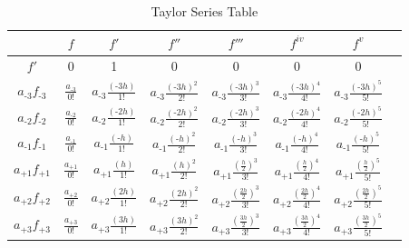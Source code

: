 \begin{table}[htbp]
	\centering
	\caption{Taylor Series Table}
		\begin{tabular}{c|c|c|c|c|c|c|c} %
			\textbf{}          &\textbf{$f$} & \textbf{$f'$}            & \textbf{$f''$}                                 & \textbf{$f'''$}                                 & \textbf{$f^{iv}$}                             & \textbf{$f^{v}$}                                \\
			\hline
			$f'$                                     & 0                                     & 1                                                       &                                                    0       &                                                              0&                                                      0&                                                                     0&\\
			$a_{\text{-}3}f_{\text{-}3}$& $\frac{a_{\text{-}3}}{0!}$ &$a_{\text{-}3}\frac{(\text{-}3h)}{1!}$ &$a_{\text{-}3}\frac{(\text{-}3h)^2}{2!}$  &$a_{\text{-}3}\frac{(\text{-}3h)^3}{3!}$   &$a_{\text{-}3}\frac{(\text{-}3h)^4}{4!}$    &$a_{\text{-}3}\frac{(\text{-}3h)^5}{5!}$   &\\ 
			$a_{\text{-}2}f_{\text{-}2}$& $\frac{a_{\text{-}2}}{0!}$ &$a_{\text{-}2}\frac{(\text{-}2h)}{1!}$ &$a_{\text{-}2}\frac{(\text{-}2h)^2}{2!}$  &$a_{\text{-}2}\frac{(\text{-}2h)^3}{3!}$   &$a_{\text{-}2}\frac{(\text{-}2h)^4}{4!}$    &$a_{\text{-}2}\frac{(\text{-}2h)^5}{5!}$   &\\
			$a_{\text{-}1}f_{\text{-}1}$& $\frac{a_{\text{-}1}}{0!}$ &$a_{\text{-}1}\frac{(\text{-}h)}{1!}$   &$a_{\text{-}1}\frac{(\text{-}h)^2}{2!}$    &$a_{\text{-}1}\frac{(\text{-}h  )^3}{3!}$   &$a_{\text{-}1}\frac{(\text{-}h )^4}{4!}$     &$a_{\text{-}1}\frac{(\text{-}h )^5}{5!}$    &\\
			$a_{+1}f_{+1}$                   & $\frac{a_{+1}}{0!}$           &$a_{+1}\frac{(h)}{1!}$                         &$a_{+1}\frac{(h)^2}{2!}$                         &$a_{+1}\frac{(\frac{h}{2})^3 }{3!}$           &$a_{+1}\frac{(\frac{h}{2})         ^4}{4!}$     &$a_{+1}\frac{(\frac{h}{2})^5}{5!}$             &\\
			$a_{+2}f_{+2}$                   & $\frac{a_{+2}}{0!}$           &$a_{+2}\frac{(2h)}{1!}$                       &$a_{+2}\frac{(2h)^2}{2!}$                       &$a_{+2}\frac{(\frac{2h}{2})^3}{3!}$          &$a_{+2}\frac{(\frac{2h}{2})       ^4}{4!}$     &$a_{+2}\frac{(\frac{2h}{2})^5}{5!}$           &\\
			$a_{+3}f_{+3}$                  & $\frac{a_{+3}}{0!}$            &$a_{+3}\frac{(3h)}{1!}$                       &$a_{+3}\frac{(3h)^2}{2!}$                       &$a_{+3}\frac{(\frac{3h}{2})^3}{3!}$          &$a_{+3}\frac{(\frac{3h}{2})       ^4}{4!}$     &$a_{+3}\frac{(\frac{3h}{2})^5}{5!}$           &\\
		\end{tabular}
		\label{tab:findiff}
\end{table}
